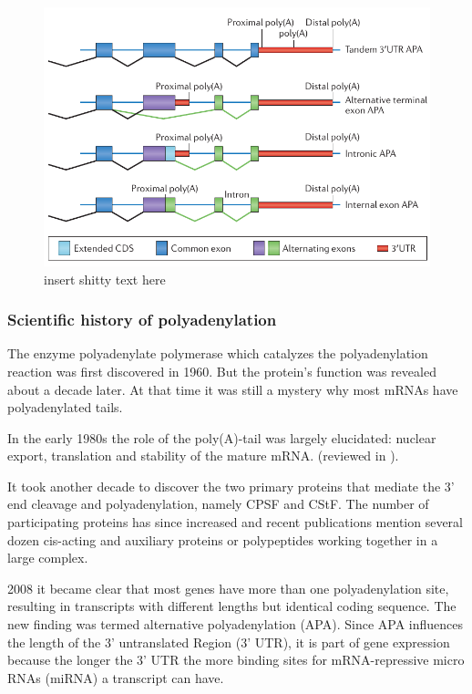 \begin{figure}[ht]
	\centering
	\includegraphics[width=1.0\textwidth]{pictures/four_types_of_APA.png}
	\caption{insert shitty text here}
	\label{four_types_of_APA}
\end{figure}

\subsubsection{Scientific history of polyadenylation}
\label{polyaHistory}
The enzyme polyadenylate polymerase which catalyzes the polyadenylation reaction was first discovered in 1960. \citep{pmid13819354} But the protein's function was revealed about a decade later. \citep{pmid5288383} At that time it was still a mystery why most mRNAs have polyadenylated tails. 

In the early 1980s the role of the poly(A)-tail was largely elucidated: nuclear export, translation and stability of the mature mRNA. (reviewed in \citep{pmid6111419}). 

It took another decade to discover the two primary proteins that mediate the 3' end cleavage and polyadenylation, namely CPSF and CStF. The number of participating proteins has since increased and recent publications mention several dozen cis-acting and auxiliary proteins or polypeptides working together in a large complex. \citep{pmid23774734} 

2008 it became clear that most genes have more than one polyadenylation site, resulting in transcripts with different lengths but identical coding sequence. \citep{pmid18411206} The new finding was termed alternative polyadenylation (APA). Since APA influences the length of the 3' untranslated Region (3' UTR), it is part of gene expression because the longer the 3' UTR the more binding sites for mRNA-repressive micro RNAs (miRNA) a transcript can have. \citep{pmid18566288}


